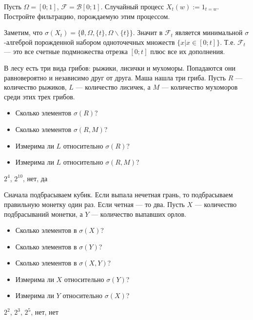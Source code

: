 \begin{problem}
Пусть $\Omega=[0;1]$, $ \mathcal{F}=\mathcal{B}[0;1] $. Случайный процесс $X_{t}(w):=1_{t=w}$. Постройте фильтрацию, порождаемую этим процессом.
\end{problem} 
\begin{solution} 
Заметим, что $\sigma(X_{t})=\{\emptyset,\Omega,\{t\},\Omega\backslash\{t\}\}$. Значит в $ \mathcal{F}_{t} $ является минимальной $\sigma  $-алгеброй порожденной набором одноточечных множеств $\{x|x\in [0;t]\}$. Т.е. $\mathcal{F}_{t}$ --- это все счетные подмножества отрезка $[0;t]$ плюс все их дополнения.
\end{solution}

\begin{problem}
В лесу есть три вида грибов: рыжики, лисички и мухоморы. Попадаются они равновероятно и независимо друг от друга. Маша нашла три гриба. Пусть $R$ --- количество рыжиков, $ L $ --- количество лисичек, а $ M $ --- количество мухоморов среди этих трех грибов.
\begin{itemize}
\item Сколько элементов $ \sigma(R)$? 
\item Сколько элементов $ \sigma(R,M)$? 
\item Измерима ли $ L $ относительно $ \sigma(R)$?
\item Измерима ли $ L $ относительно $ \sigma(R,M)$?
\end{itemize} 
\end{problem} 
\begin{solution} 
$ 2^{4} $, $2^{10}$, нет, да 
\end{solution}

\begin{problem}
Сначала подбрасываем кубик. Если выпала нечетная грань, то подбрасываем правильную монетку один раз. Если четная --- то два. Пусть $X$ --- количество подбрасываний монетки, а $Y$ --- количество выпавших орлов.

\begin{itemize}

\item Сколько элементов в $ \sigma(X)$? 
\item Сколько элементов в $ \sigma(Y)$? 
\item Сколько элементов в $ \sigma(X,Y)$? 
\item Измерима ли $ X $ относительно $ \sigma(Y)$? 
\item Измерима ли $ Y $ относительно $ \sigma(X)$? 

\end{itemize} 
\end{problem} 
\begin{solution} 
 $ 2^{2} $, $ 2^{3} $, $ 2^{5} $, нет, нет
\end{solution}

